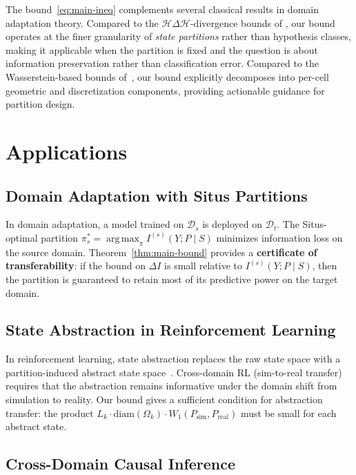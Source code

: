 \documentclass[12pt,a4paper]{article}
\newcommand{\cD}{\mathcal{D}}
\newcommand{\cH}{\mathcal{H}}
\newcommand{\argmax}{\operatorname*{arg\,max}}
\newcommand{\Wass}{W_1}
\newcommand{\diam}{\mathrm{diam}}
\begin{document}
The bound~\eqref{eq:main-ineq} complements several classical results in
domain adaptation theory.  Compared to the
$\cH\Delta\cH$-divergence bounds of \citet{ben2007analysis}, our bound
operates at the finer granularity of \emph{state partitions} rather than
hypothesis classes, making it applicable when the partition is fixed
and the question is about information preservation rather than
classification error.  Compared to the Wasserstein-based bounds
of~\citet{shen2018wasserstein}, our bound explicitly decomposes into
per-cell geometric and discretization components, providing actionable
guidance for partition design.

\section{Applications}
\label{sec:applications}

\subsection{Domain Adaptation with Situs Partitions}

In domain adaptation, a model trained on $\cD_s$ is deployed on $\cD_t$.
The Situs-optimal partition $\pi^*_s = \argmax_\pi I^{(s)}(Y;P\mid S)$
minimizes information loss on the source domain.  Theorem~\ref{thm:main-bound}
provides a \textbf{certificate of transferability}: if the bound on
$\Delta I$ is small relative to $I^{(s)}(Y;P\mid S)$, then the partition
is guaranteed to retain most of its predictive power on the target domain.

\subsection{State Abstraction in Reinforcement Learning}

In reinforcement learning, state abstraction replaces the raw state space
with a partition-induced abstract state space~\citep{li2006towards}.
Cross-domain RL (sim-to-real transfer) requires that the abstraction
remains informative under the domain shift from simulation to reality.
Our bound gives a sufficient condition for abstraction transfer:
the product $L_k\cdot\diam(\Omega_k)\cdot\Wass(P_{\text{sim}},P_{\text{real}})$
must be small for each abstract state.

\subsection{Cross-Domain Causal Inference}
\end{document}
